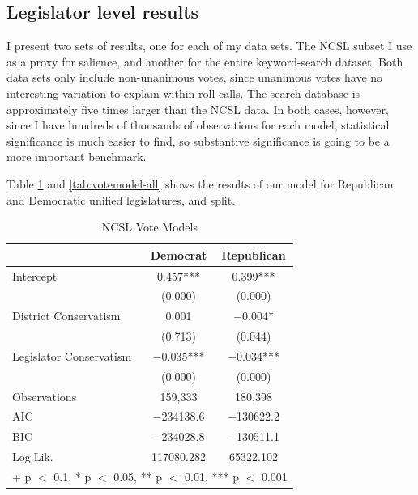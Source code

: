 \documentclass[
  oneside]{book}
\begin{document}
\hypertarget{legislator-level-results}{%
\subsection{Legislator level results}\label{legislator-level-results}}

I present two sets of results, one for each of my data sets. The NCSL subset I use as a proxy for salience, and another for the entire keyword-search dataset. Both data sets only include non-unanimous votes, since unanimous votes have no interesting variation to explain within roll calls. The search database is approximately five times larger than the NCSL data. In both cases, however, since I have hundreds of thousands of observations for each model, statistical significance is much easier to find, so substantive significance is going to be a more important benchmark.

Table \ref{tab:votemodel-ncsl} and \ref{tab:votemodel-all} shows the results of our model for Republican and Democratic unified legislatures, and split.

\begin{table}

\caption{\label{tab:votemodel-ncsl}NCSL Vote Models}
\centering
\begin{tabular}[t]{lcc}
\toprule
  & Democrat & Republican\\
\midrule
Intercept & \num{0.457}*** & \num{0.399}***\\
 & (\num{0.000}) & \vphantom{1} (\num{0.000})\\
District Conservatism & \num{0.001} & \num{-0.004}*\\
 & (\num{0.713}) & (\num{0.044})\\
Legislator Conservatism & \num{-0.035}*** & \num{-0.034}***\\
 & (\num{0.000}) & (\num{0.000})\\
Observations & 159,333 & 180,398\\
\midrule
AIC & \num{-234138.6} & \num{-130622.2}\\
BIC & \num{-234028.8} & \num{-130511.1}\\
Log.Lik. & \num{117080.282} & \num{65322.102}\\
\bottomrule
\multicolumn{3}{l}{\rule{0pt}{1em}+ p $<$ 0.1, * p $<$ 0.05, ** p $<$ 0.01, *** p $<$ 0.001}\\
\end{tabular}
\end{table}
\end{document}
